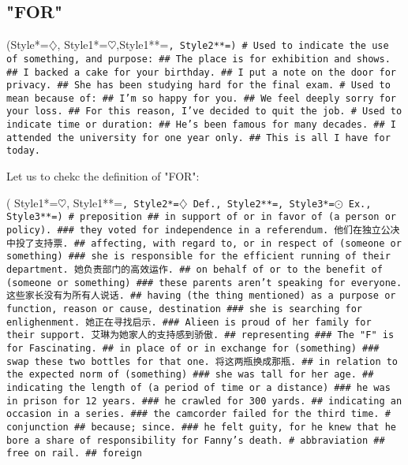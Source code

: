 \subsection{"FOR"}

\begin{easylist}[checklist]
\ListProperties(Style*=$\diamondsuit$\quad, Style1*=$\heartsuit$\quad,Style1**=\large\tt\color{google@red}, Style2**=\tt\color{google@blue})
# Used to indicate the use of something, and purpose:
## The place is for exhibition and shows.
## I backed a cake for your birthday.
## I put a note on the door for privacy.
## She has been studying hard for the final exam.
# Used to mean because of:
## I'm so happy for you.
## We feel deeply sorry for your loss.
## For this reason, I've decided to quit the job.
# Used to indicate time or duration:
## He's been famous for many decades.
## I attended the university for one year only.
## This is all I have for today.
\end{easylist}

\medskip
\noindent Let us to chekc the definition of "FOR":
\begin{easylist}[checklist]
\ListProperties( Style1*=$\heartsuit$\quad, Style1**=\Large\tt\color{google@yellow},
                 Style2*={\color{red}\tt$\diamondsuit$ Def.}\quad, Style2**=\tt\color{google@red},
                 Style3*={\color{red}\tt$\odot$ Ex.}\quad, Style3**=\tt\color{google@blue})
# preposition
## in support of or in favor of (a person or policy).
### they voted for independence in a referendum.
\chn 他们在独立公决中投了支持票.
## affecting, with regard to, or in respect of (someone or something)
### she is responsible for the efficient running of their department.
\chn 她负责部门的高效运作.
## on behalf of or to the benefit of (someone or something) 
### these parents aren't speaking for everyone.
\chn 这些家长没有为所有人说话.
##  having (the thing mentioned) as a purpose or function, reason or cause, destination
### she is searching for enlighenment.
\chn 她正在寻找启示.
### Alieen is proud of her family for their support.
\chn 艾琳为她家人的支持感到骄傲.
## representing
### The "F" is for Fascinating.
## in place of or in exchange for (something)
### swap these two bottles for that one.
\chn 将这两瓶换成那瓶.
## in relation to the expected norm of (something)
### she was tall for her age.
## indicating the length of (a period of time or a distance)
### he was in prison for 12 years.
### he crawled for 300 yards.
## indicating an occasion in a series.
### the camcorder failed for the third time.
# conjunction
## because; since.
### he felt guity, for he knew that he bore a share of responsibility for Fanny's death.
# abbraviation
## free on rail.
## foreign
\end{easylist}



\egroup %